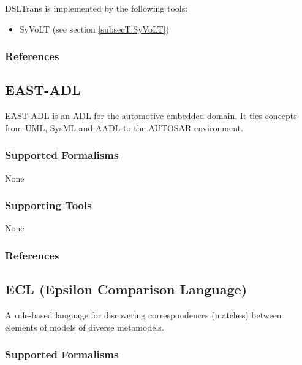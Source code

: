 DSLTrans is implemented by the following tools:
\begin{itemize}
	\item SyVoLT (see section \ref{subsecT:SyVoLT})
\end{itemize}


\subsubsection{References}





\subsection{EAST-ADL}
\label{subsecL:EAST-ADL}

\author{Stefan}

EAST-ADL is an ADL for the automotive embedded domain. 
It ties concepts from UML, SysML and AADL to the AUTOSAR environment.


\subsubsection{Supported Formalisms}

None


\subsubsection{Supporting Tools}

None


\subsubsection{References}




\subsection{ECL (Epsilon Comparison Language)}
\label{subsecL:ECL}


A rule-based language for discovering correspondences (matches) between elements of models of diverse metamodels.

\subsubsection{Supported Formalisms}

